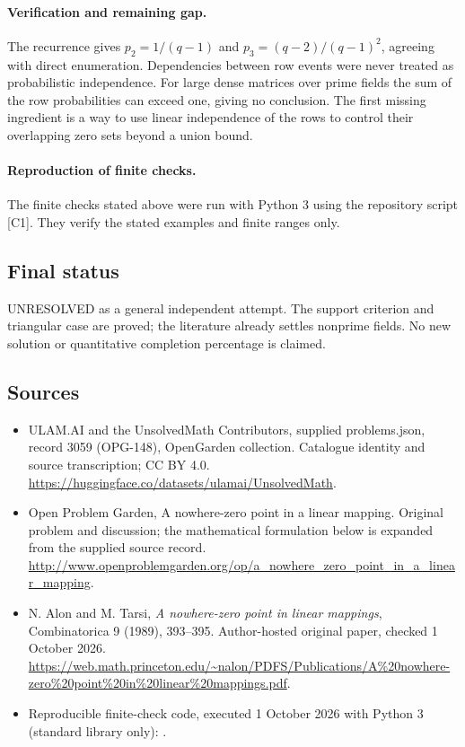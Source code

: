 \documentclass[11pt,a4paper]{article}
\begin{document}
\paragraph{Verification and remaining gap.}
The recurrence gives $p_2=1/(q-1)$ and
$p_3=(q-2)/(q-1)^2$, agreeing with direct enumeration. Dependencies
between row events were never treated as probabilistic independence.
For large dense matrices over prime fields the sum of the row
probabilities can exceed one, giving no conclusion. The first missing
ingredient is a way to use linear independence of the rows to control
their overlapping zero sets beyond a union bound.

\paragraph{Reproduction of finite checks.}
The finite checks stated above were run with Python 3 using the repository
script [C1]. They verify the stated examples and finite ranges only.

\subsection{Final status}
UNRESOLVED as a general independent attempt. The support criterion and
triangular case are proved; the literature already settles nonprime
fields. No new solution or quantitative completion percentage is claimed.

\subsection{Sources}
\begin{itemize}
\item[S1] ULAM.AI and the UnsolvedMath Contributors, supplied problems.json, record 3059 (OPG-148), OpenGarden collection. Catalogue identity and source transcription; CC BY 4.0.
\url{https://huggingface.co/datasets/ulamai/UnsolvedMath}.
\item[S2] Open Problem Garden, A nowhere-zero point in a linear mapping. Original problem and discussion; the mathematical formulation below is expanded from the supplied source record.
\url{http://www.openproblemgarden.org/op/a_nowhere_zero_point_in_a_linear_mapping}.
\item[S3] N. Alon and M. Tarsi, \emph{A nowhere-zero point in linear mappings}, Combinatorica 9 (1989), 393--395. Author-hosted original paper, checked 1 October 2026.
\url{https://web.math.princeton.edu/~nalon/PDFS/Publications/A%20nowhere-zero%20point%20in%20linear%20mappings.pdf}.
\item[C1] Reproducible finite-check code, executed 1 October 2026 with Python 3 (standard library only):
.
\end{itemize}
\end{document}
